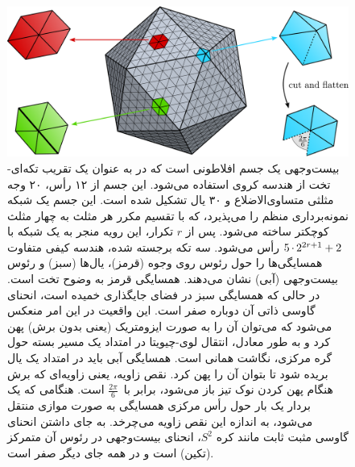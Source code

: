 \begin{figure}
	\centering
	\includegraphics[width=.8\textwidth]{figures/icosahedron_neighborhoods.pdf}
	\vspace*{1ex}
	\caption{\small
		بیست‌وجهی یک جسم افلاطونی است که در \cite{liu2018icoAltAz,gaugeIco2019,zhang2019orientation} به عنوان یک تقریب تکه‌ای-تخت از هندسه کروی استفاده می‌شود.
		این جسم از ۱۲ رأس، ۲۰ وجه مثلثی متساوی‌الاضلاع و ۳۰ یال تشکیل شده است.
		این جسم یک شبکه نمونه‌برداری منظم را می‌پذیرد، که با تقسیم مکرر هر مثلث به چهار مثلث کوچکتر ساخته می‌شود.
		پس از $r$ تکرار، این رویه منجر به یک شبکه با ${5\mkern-1mu\cdot\mkern-1mu 2^{2r+1} + 2}$ رأس می‌شود.
		سه تکه برجسته شده، هندسه کیفی متفاوت همسایگی‌ها را حول رئوس روی وجوه (قرمز)، یال‌ها (سبز) و رئوس بیست‌وجهی (آبی) نشان می‌دهند.
		همسایگی قرمز به وضوح تخت است.
		در حالی که همسایگی سبز در فضای جایگذاری خمیده است، انحنای گاوسی ذاتی آن دوباره صفر است.
		این واقعیت در این امر منعکس می‌شود که می‌توان آن را به صورت ایزومتریک (یعنی بدون برش) پهن کرد و به طور معادل، انتقال لوی-چیویتا در امتداد یک مسیر بسته حول گره مرکزی، نگاشت همانی است.
		همسایگی آبی باید در امتداد یک یال بریده شود تا بتوان آن را پهن کرد.
		نقص زاویه، یعنی زاویه‌ای که برش هنگام پهن کردن نوک تیز باز می‌شود، برابر با~$\frac{2\pi}{6}$ است.
		هنگامی که یک بردار یک بار حول رأس مرکزی همسایگی به صورت موازی منتقل می‌شود، به اندازه این نقص زاویه می‌چرخد.
		به جای داشتن انحنای گاوسی مثبت ثابت مانند کره $S^2$، انحنای بیست‌وجهی در رئوس آن متمرکز (تکین) است و در همه جای دیگر صفر است.
	}
	\label{fig:ico_neighborhoods}
\end{figure}


